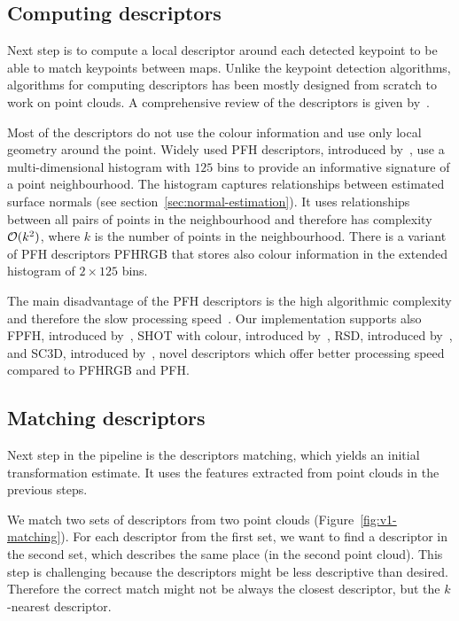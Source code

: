 \subsection{Computing descriptors}
\label{sec:compute-descriptors}

Next step is to compute a local descriptor around each detected keypoint to be able to match keypoints between maps. Unlike the keypoint detection algorithms, algorithms for computing descriptors has been mostly designed from scratch to work on point clouds. A comprehensive review of the descriptors is given by~\citet{YasirThesis}.

Most of the descriptors do not use the colour information and use only local geometry around the point. Widely used \gls{PFH} descriptors, introduced by~\citet{rusu2008pfh}, use a multi-dimensional histogram with $125$ bins to provide an informative signature of a point neighbourhood. The histogram captures relationships between estimated surface normals (see section~\ref{sec:normal-estimation}). It uses relationships between all pairs of points in the neighbourhood and therefore has complexity $\operatorname{\mathcal{O}}(k^2)$, where $k$ is the number of points in the neighbourhood. There is a variant of \gls{PFH} descriptors \gls{PFHRGB} that stores also colour information in the extended histogram of $2 \times 125$ bins.

The main disadvantage of the \gls{PFH} descriptors is the high algorithmic complexity and therefore the slow processing speed~\citep{rusu2009fpfh}. Our implementation supports also \gls{FPFH}, introduced by~\citet{rusu2009fpfh}, \gls{SHOT} with colour, introduced by~\citet{tombari2011shot}, \gls{RSD}, introduced by~\citet{marton2010rsd}, and \gls{SC3D}, introduced by~\citet{frome2004sc3d}, novel descriptors which offer better processing speed compared to \gls{PFHRGB} and \gls{PFH}.

\subsection{Matching descriptors}
\label{sec:matching}

Next step in the pipeline is the descriptors matching, which yields an initial transformation estimate. It uses the features extracted from point clouds in the previous steps.

We match two sets of descriptors from two point clouds (Figure~\ref{fig:v1-matching}). For each descriptor from the first set, we want to find a descriptor in the second set, which describes the same place (in the second point cloud). This step is challenging because the descriptors might be less descriptive than desired. Therefore the correct match might not be always the closest descriptor, but the $k$-nearest descriptor.

